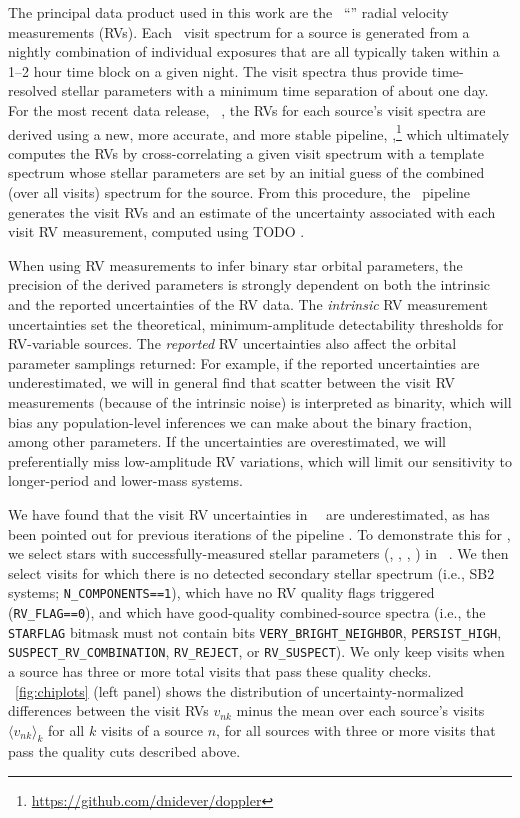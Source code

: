 The principal data product used in this work are the \apogee\ ``\visit'' radial
velocity measurements (RVs).
Each \apogee\ visit spectrum for a source is generated from a nightly
combination of individual exposures that are all typically taken within a 1--2
hour time block on a given night.
The visit spectra thus provide time-resolved stellar parameters with a minimum
time separation of about one day.
For the most recent data release, \apogee\ \thisdr, the RVs for
each source's visit spectra are derived using a new, more accurate, and more
stable pipeline,
,\footnote{\url{https://github.com/dnidever/doppler}}
which ultimately computes the RVs by cross-correlating a given visit spectrum
with a template spectrum whose stellar parameters are set by an initial guess of
the combined (over all visits) spectrum for the source.
From this procedure, the \apogee\ pipeline generates the visit RVs and an
estimate of the uncertainty associated with each visit RV measurement, computed
using TODO \citep{TODO}.

When using RV measurements to infer binary star orbital parameters, the
precision of the derived parameters is strongly dependent on both the intrinsic
and the reported uncertainties of the RV data.
The \emph{intrinsic} RV measurement uncertainties set the theoretical,
minimum-amplitude detectability thresholds for RV-variable sources.
The \emph{reported} RV uncertainties also affect the orbital parameter samplings
returned:
For example, if the reported uncertainties are underestimated, we will in
general find that scatter between the visit RV measurements (because of the
intrinsic noise) is interpreted as binarity, which will bias any
population-level inferences we can make about the binary fraction, among other
parameters.
If the uncertainties are overestimated, we will preferentially miss
low-amplitude RV variations, which will limit our sensitivity to longer-period
and lower-mass systems.

We have found that the visit RV uncertainties in \apogee\ \thisdr\ are
underestimated, as has been pointed out for previous iterations of the pipeline
\citep[e.g.,][]{TODO, BadenesIthink, Price-Whelan:2020}.
To demonstrate this for \thisdr, we select stars with successfully-measured
stellar parameters (\logg, \Teff, \mh, \vsini) in \apogee\ \thisdr.
We then select visits for which there is no detected secondary stellar spectrum
(i.e., SB2 systems; \texttt{N\_COMPONENTS==1}), which have no RV quality flags
triggered (\texttt{RV\_FLAG==0}), and which have good-quality combined-source
spectra (i.e., the \texttt{STARFLAG} bitmask must not contain bits
\texttt{VERY\_BRIGHT\_NEIGHBOR}, \texttt{PERSIST\_HIGH},
\texttt{SUSPECT\_RV\_COMBINATION}, \texttt{RV\_REJECT}, or
\texttt{RV\_SUSPECT}).
We only keep visits when a source has three or more total visits that pass these
quality checks.
\figurename~\ref{fig:chiplots} (left panel) shows the distribution of
uncertainty-normalized differences between the visit RVs $v_{nk}$ minus the mean
over each source's visits $\langle v_{nk} \rangle_k$ for all $k$ visits of a
source $n$, for all sources with three or more visits that pass the quality cuts
described above.

